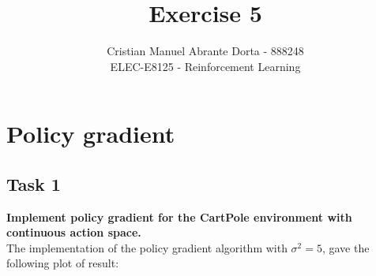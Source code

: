 \documentclass[12pt]{article}
\begin{document}
 
\title{Exercise 5}
\author{Cristian Manuel Abrante Dorta - 888248\\
ELEC-E8125 - Reinforcement Learning}

\maketitle
\section{Policy gradient}

\subsection{Task 1}
\textbf{Implement policy gradient for the CartPole environment with continuous
action space.}\\

The implementation of the policy gradient algorithm with $\sigma^2 = 5$, gave the following plot of result:
\end{document}
